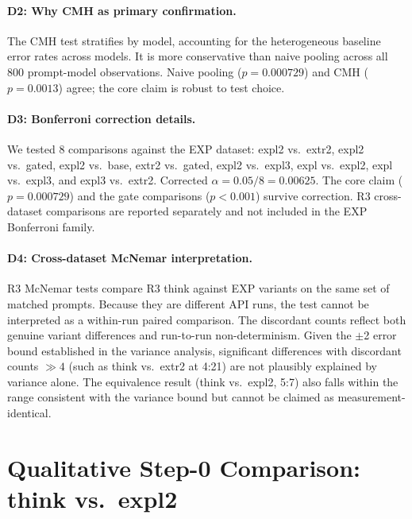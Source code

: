 \documentclass[11pt,a4paper]{article}
\begin{document}
\paragraph{D2: Why CMH as primary confirmation.}
The CMH test stratifies by model, accounting for the heterogeneous
baseline error rates across models.  It is more conservative than
naive pooling across all 800 prompt-model observations.  Naive pooling
($p = 0.000729$) and CMH ($p = 0.0013$) agree; the core claim is robust
to test choice.

\paragraph{D3: Bonferroni correction details.}
We tested 8 comparisons against the EXP dataset:
\textsf{expl2} vs.\ \textsf{extr2},
\textsf{expl2} vs.\ \textsf{gated},
\textsf{expl2} vs.\ \textsf{base},
\textsf{extr2} vs.\ \textsf{gated},
\textsf{expl2} vs.\ \textsf{expl3},
\textsf{expl} vs.\ \textsf{expl2},
\textsf{expl} vs.\ \textsf{expl3},
and \textsf{expl3} vs.\ \textsf{extr2}.
Corrected $\alpha = 0.05/8 = 0.00625$.
The core claim ($p = 0.000729$) and the gate comparisons ($p < 0.001$)
survive correction.  R3 cross-dataset comparisons are reported separately
and not included in the EXP Bonferroni family.

\paragraph{D4: Cross-dataset McNemar interpretation.}
R3 McNemar tests compare R3 \textsf{think} against EXP variants on the same
set of matched prompts.  Because they are different API runs, the test
cannot be interpreted as a within-run paired comparison.  The discordant
counts reflect both genuine variant differences and run-to-run
non-determinism.  Given the $\pm$2 error bound established in the variance
analysis, significant differences with discordant counts $\gg 4$ (such as
think vs.\ extr2 at 4:21) are not plausibly explained by variance alone.
The equivalence result (think vs.\ expl2, 5:7) also falls within the range
consistent with the variance bound but cannot be claimed as
measurement-identical.

\section{Qualitative Step-0 Comparison: \textsf{think} vs.\ \textsf{expl2}}
\label{app:qualitative}
\end{document}
